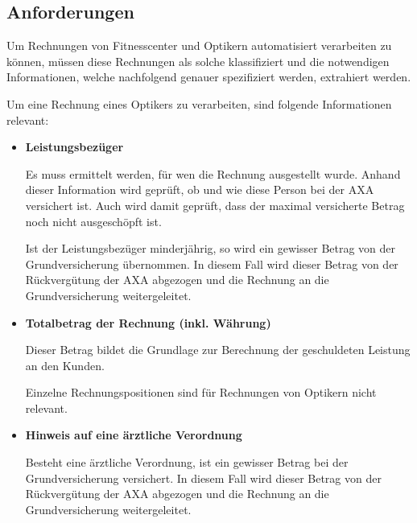 


\subsection{Anforderungen}
\label{chap:requirements}

Um Rechnungen von Fitnesscenter und Optikern automatisiert verarbeiten zu können, müssen diese Rechnungen als solche klassifiziert und die notwendigen Informationen, welche nachfolgend genauer spezifiziert werden, extrahiert werden.

Um eine Rechnung eines Optikers zu verarbeiten, sind folgende Informationen relevant:

\begin{itemize}
    \item \textbf{Leistungsbezüger}
    
    Es muss ermittelt werden, für wen die Rechnung ausgestellt wurde. Anhand dieser Information wird geprüft, ob und wie diese Person bei der AXA versichert ist. Auch wird damit geprüft, dass der maximal versicherte Betrag noch nicht ausgeschöpft ist.
    
    Ist der Leistungsbezüger minderjährig, so wird ein gewisser Betrag von der Grundversicherung übernommen. In diesem Fall wird dieser Betrag von der Rückvergütung der AXA abgezogen und die Rechnung an die Grundversicherung weitergeleitet.
    
    \item \textbf{Totalbetrag der Rechnung (inkl. Währung)}
    
    Dieser Betrag bildet die Grundlage zur Berechnung der geschuldeten Leistung an den Kunden. 
    
    Einzelne Rechnungspositionen sind für Rechnungen von Optikern nicht relevant.
    
    \item \textbf{Hinweis auf eine ärztliche Verordnung}
    
    Besteht eine ärztliche Verordnung, ist ein gewisser Betrag bei der Grundversicherung versichert. In diesem Fall wird dieser Betrag von der Rückvergütung der AXA abgezogen und die Rechnung an die Grundversicherung weitergeleitet.
\end{itemize}

